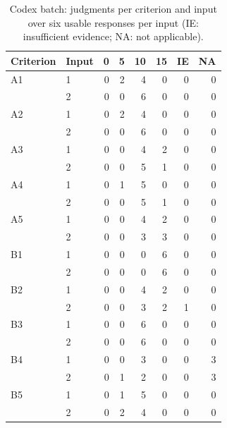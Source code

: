 \documentclass[10pt,conference]{IEEEtran}
\begin{document}
\begin{table}[t]
\caption{Codex batch: judgments per criterion and input over six usable responses per input (IE: insufficient evidence; NA: not applicable).}
\label{tab:ratings-codex}
\centering\small\begin{tabular}{llrrrrrr}\toprule
Criterion & Input & 0 & 5 & 10 & 15 & IE & NA \\
\midrule
A1 & 1 & 0 & 2 & 4 & 0 & 0 & 0 \\
 & 2 & 0 & 0 & 6 & 0 & 0 & 0 \\
A2 & 1 & 0 & 2 & 4 & 0 & 0 & 0 \\
 & 2 & 0 & 0 & 6 & 0 & 0 & 0 \\
A3 & 1 & 0 & 0 & 4 & 2 & 0 & 0 \\
 & 2 & 0 & 0 & 5 & 1 & 0 & 0 \\
A4 & 1 & 0 & 1 & 5 & 0 & 0 & 0 \\
 & 2 & 0 & 0 & 5 & 1 & 0 & 0 \\
A5 & 1 & 0 & 0 & 4 & 2 & 0 & 0 \\
 & 2 & 0 & 0 & 3 & 3 & 0 & 0 \\
B1 & 1 & 0 & 0 & 0 & 6 & 0 & 0 \\
 & 2 & 0 & 0 & 0 & 6 & 0 & 0 \\
B2 & 1 & 0 & 0 & 4 & 2 & 0 & 0 \\
 & 2 & 0 & 0 & 3 & 2 & 1 & 0 \\
B3 & 1 & 0 & 0 & 6 & 0 & 0 & 0 \\
 & 2 & 0 & 0 & 6 & 0 & 0 & 0 \\
B4 & 1 & 0 & 0 & 3 & 0 & 0 & 3 \\
 & 2 & 0 & 1 & 2 & 0 & 0 & 3 \\
B5 & 1 & 0 & 1 & 5 & 0 & 0 & 0 \\
 & 2 & 0 & 2 & 4 & 0 & 0 & 0 \\
\bottomrule\end{tabular}
\end{table}
\end{document}
